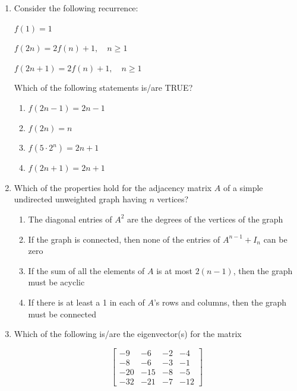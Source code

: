 \begin{enumerate}
\hfill{}

\item Consider the following recurrence:  

$f(1)=1$  

$f(2n)=2f(n)+1, \quad n \geq 1$  

$f(2n+1)=2f(n)+1, \quad n \geq 1$  

Which of the following statements is/are TRUE?  

\begin{enumerate}
\item $f(2n-1)=2n-1$
\item $f(2n)=n$
\item $f(5 \cdot 2^n)=2n+1$
\item $f(2n+1)=2n+1$
\end{enumerate}

\hfill{}

\item Which of the properties hold for the adjacency matrix $A$ of a simple undirected unweighted graph having $n$ vertices?  

\begin{enumerate}
\item The diagonal entries of $A^2$ are the degrees of the vertices of the graph
\item If the graph is connected, then none of the entries of $A^{n-1}+I_n$ can be zero
\item If the sum of all the elements of $A$ is at most $2(n-1)$, then the graph must be acyclic
\item If there is at least a 1 in each of $A$’s rows and columns, then the graph must be connected
\end{enumerate}

\hfill{}

\item Which of the following is/are the eigenvector(s) for the matrix  

\[
\begin{bmatrix}
-9 & -6 & -2 & -4\\
-8 & -6 & -3 & -1\\
-20 & -15 & -8 & -5\\
-32 & -21 & -7 & -12
\end{bmatrix}
\]


\end{enumerate}
